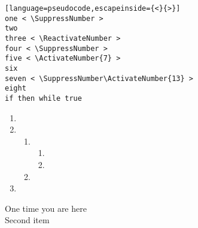 \begin{lstlisting}[language=pseudocode,escapeinside={<}{>}]
one < \SuppressNumber >
two
three < \ReactivateNumber >
four < \SuppressNumber >
five < \ActivateNumber{7} >
six
seven < \SuppressNumber\ActivateNumber{13} >
eight
if then while true
\end{lstlisting}

    \begin{enumerate}
        \item \lipsum[1-3]
        \item \lipsum[2-4]
            \begin{enumerate}
                \item \lipsum[3-5]
                    \begin{enumerate}
                        \item \lipsum[3-5]
                        \item \lipsum[4-6]
                    \end{enumerate}
                \item \lipsum[4-6]
            \end{enumerate}
        \item \lipsum[2-4]
    \end{enumerate}

    \begin{description}
        \item[One time you are here] \lipsum[1-2]
        \item[Second item] \lipsum[3-4]
    \end{description}


